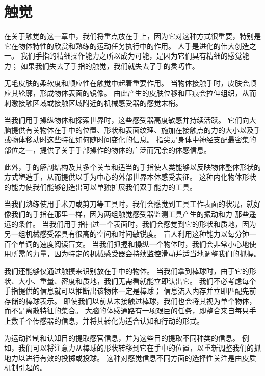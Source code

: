 \chapter{触觉}
在关于触觉的这一章中，我们将重点放在手上，因为它对这种方式很重要，特别是它在物体特性的欣赏和熟练的运动任务执行中的作用。 人手是进化的伟大创造之一。 我们手指的精细操作能力之所以成为可能，是因为它们具有精细的感觉能力； 如果我们失去了手指的触觉，我们就失去了手的灵巧性。

无毛皮肤的柔软度和顺应性在触觉中起着重要作用。 当物体接触手时，皮肤会顺应其轮廓，形成物体表面的镜像。 由此产生的皮肤位移和压痕会拉伸组织，从而刺激接触区域或接触区域附近的机械感受器的感觉末梢。

当我们用手操纵物体和探索世界时，这些感受器高度敏感并持续活跃。 它们向大脑提供有关物体在手中的位置、形状和表面纹理、施加在接触点的力的大小以及手或物体移动时这些特征如何随时间变化的信息。 指尖是身体中神经支配最密集的部位之一，提供了关于手部操作的物体的广泛而冗余的体感信息。

此外，手的解剖结构及其多个关节和适当的手指使人类能够以反映物体整体形状的方式塑造手，从而提供以手为中心的外部世界本体感受表征。 这种内化物体形状的能力使我们能够创造出可以单独扩展我们双手能力的工具。

当我们熟练使用手术刀或剪刀等工具时，我们会感觉到工具工作表面的状况，就好像我们的手指在那里一样，因为两组触觉感受器监测工具产生的振动和力 那些遥远的条件。 当我们用手指扫过一个表面时，我们会感觉到它的形状和质地，因为另一组机械感受器具有很高的空间和时间敏锐度。 盲人利用这种能力以每分钟一百个单词的速度阅读盲文。 当我们抓握和操纵一个物体时，我们会非常小心地使用所需的力量，因为特定的机械感受器会持续监控滑动并适当地调整我们的抓握。

我们还能够仅通过触摸来识别放在手中的物体。 当我们拿到棒球时，由于它的形状、大小、重量、密度和质地，我们无需看就能立即认出它。 我们不必考虑每个手指提供的信息就可以推断出该物体一定是棒球； 信息流入内存并立即匹配先前存储的棒球表示。 即使我们以前从未接触过棒球，我们也会将其视为单个物体，而不是离散特征的集合。 大脑的体感通路有一项艰巨的任务，即整合来自每只手上数千个传感器的信息，并将其转化为适合认知和行动的形式。

为运动控制和认知目的提取感官信息，并为这些目的提取不同种类的信息。 例如，我们可以将注意力从棒球的形状转移到它在手中的位置，以重新调整我们的抓地力以进行有效的投掷或投球。 这种对感觉信息不同方面的选择性关注是由皮质机制引起的。

